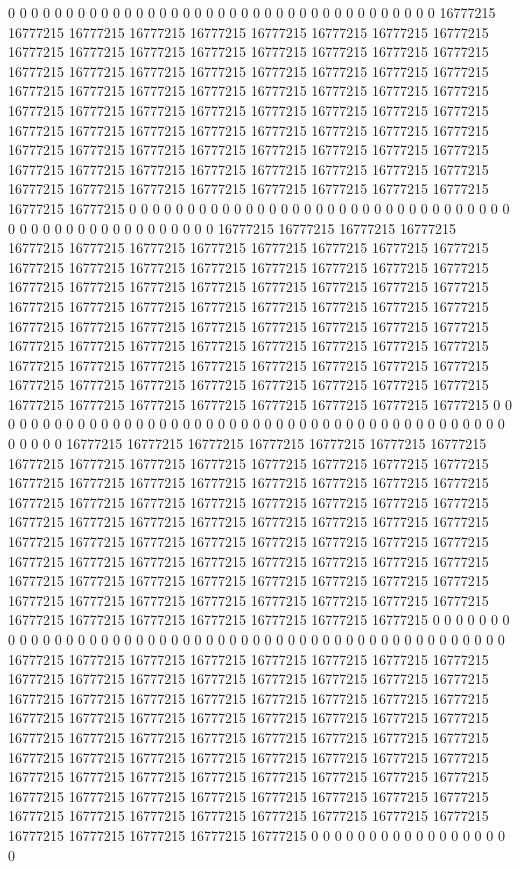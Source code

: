 0 0 0 0 0 0 0 0 0 0 0 0 0 0 0 0 0 0 0 0 0 0 0 0 0 0 0 0 0 0 0 0 0 0 0 0 0 16777215 16777215 16777215 16777215 16777215 16777215 16777215 16777215 16777215 16777215 16777215 16777215 16777215 16777215 16777215 16777215 16777215 16777215 16777215 16777215 16777215 16777215 16777215 16777215 16777215 16777215 16777215 16777215 16777215 16777215 16777215 16777215 16777215 16777215 16777215 16777215 16777215 16777215 16777215 16777215 16777215 16777215 16777215 16777215 16777215 16777215 16777215 16777215 16777215 16777215 16777215 16777215 16777215 16777215 16777215 16777215 16777215 16777215 16777215 16777215 16777215 16777215 16777215 16777215 16777215 16777215 16777215 16777215 16777215 16777215 16777215 16777215 16777215 16777215 16777215 0 0 0 0 0 0 0 0 0 0 0 0 0 0 0 0
0 0 0 0 0 0 0 0 0 0 0 0 0 0 0 0 0 0 0 0 0 0 0 0 0 0 0 0 0 0 0 0 0 0 0 16777215 16777215 16777215 16777215 16777215 16777215 16777215 16777215 16777215 16777215 16777215 16777215 16777215 16777215 16777215 16777215 16777215 16777215 16777215 16777215 16777215 16777215 16777215 16777215 16777215 16777215 16777215 16777215 16777215 16777215 16777215 16777215 16777215 16777215 16777215 16777215 16777215 16777215 16777215 16777215 16777215 16777215 16777215 16777215 16777215 16777215 16777215 16777215 16777215 16777215 16777215 16777215 16777215 16777215 16777215 16777215 16777215 16777215 16777215 16777215 16777215 16777215 16777215 16777215 16777215 16777215 16777215 16777215 16777215 16777215 16777215 16777215 16777215 16777215 16777215 16777215 0 0 0 0 0 0 0 0 0 0 0 0 0 0 0 0 0
0 0 0 0 0 0 0 0 0 0 0 0 0 0 0 0 0 0 0 0 0 0 0 0 0 0 0 0 0 0 0 0 0 16777215 16777215 16777215 16777215 16777215 16777215 16777215 16777215 16777215 16777215 16777215 16777215 16777215 16777215 16777215 16777215 16777215 16777215 16777215 16777215 16777215 16777215 16777215 16777215 16777215 16777215 16777215 16777215 16777215 16777215 16777215 16777215 16777215 16777215 16777215 16777215 16777215 16777215 16777215 16777215 16777215 16777215 16777215 16777215 16777215 16777215 16777215 16777215 16777215 16777215 16777215 16777215 16777215 16777215 16777215 16777215 16777215 16777215 16777215 16777215 16777215 16777215 16777215 16777215 16777215 16777215 16777215 16777215 16777215 16777215 16777215 16777215 16777215 16777215 16777215 16777215 16777215 16777215 0 0 0 0 0 0 0 0 0 0 0 0 0 0 0 0 0
0 0 0 0 0 0 0 0 0 0 0 0 0 0 0 0 0 0 0 0 0 0 0 0 0 0 0 0 0 0 0 0 0 16777215 16777215 16777215 16777215 16777215 16777215 16777215 16777215 16777215 16777215 16777215 16777215 16777215 16777215 16777215 16777215 16777215 16777215 16777215 16777215 16777215 16777215 16777215 16777215 16777215 16777215 16777215 16777215 16777215 16777215 16777215 16777215 16777215 16777215 16777215 16777215 16777215 16777215 16777215 16777215 16777215 16777215 16777215 16777215 16777215 16777215 16777215 16777215 16777215 16777215 16777215 16777215 16777215 16777215 16777215 16777215 16777215 16777215 16777215 16777215 16777215 16777215 16777215 16777215 16777215 16777215 16777215 16777215 16777215 16777215 16777215 16777215 16777215 16777215 16777215 16777215 16777215 0 0 0 0 0 0 0 0 0 0 0 0 0 0 0 0 0 0
